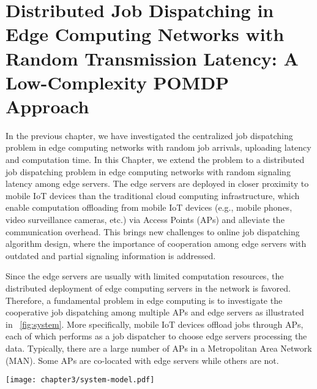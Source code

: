 
\chapter{Distributed Job Dispatching in Edge Computing Networks with Random Transmission Latency: A Low-Complexity POMDP Approach}
\label{ch3}

In the previous chapter, we have investigated the centralized job dispatching problem in edge computing networks with random job arrivals, uploading latency and computation time.
In this Chapter, we extend the problem to a distributed job dispatching problem in edge computing networks with random signaling latency among edge servers.
The edge servers are deployed in closer proximity to mobile IoT devices than the traditional cloud computing infrastructure, which enable computation offloading from mobile IoT devices (e.g., mobile phones, video surveillance cameras, etc.) via Access Points (APs) and alleviate the communication overhead.
This brings new challenges to online job dispatching algorithm design, where the importance of cooperation among edge servers with outdated and partial signaling information is addressed.

Since the edge servers are usually with limited computation resources, the distributed deployment of edge computing servers in the network is favored.
Therefore, a fundamental problem in edge computing is to investigate the cooperative job dispatching among multiple APs and edge servers as illustrated in \figurename~\ref{fig:system}.
More specifically, mobile IoT devices offload jobs through APs, each of which performs as a job dispatcher to choose edge servers processing the data. Typically, there are a large number of APs in a Metropolitan Area Network (MAN). Some APs are co-located with edge servers while others are not.

\begin{figure*}[htp!]
    \centering
    \texttt{[image: chapter3/system-model.pdf]}
    \caption{The illustration of system model.}
    \label{fig:system}
\end{figure*}

